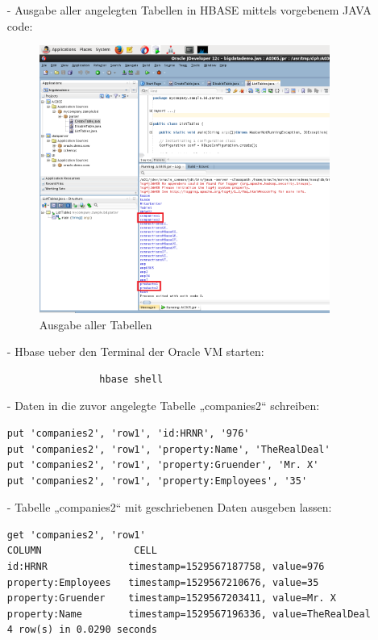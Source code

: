 \begin{itemize}
\item[-] Ausgabe aller angelegten Tabellen in HBASE mittels vorgebenem JAVA code:
\begin{figure}[!htb]
        \begin{minipage}{1\textwidth}
                \centering
                \includegraphics[width=0.90\textwidth]{pics/hbase3.png}\par\vspace{0cm}
                \caption{Ausgabe aller Tabellen}
                \label{fig:hbase3}
        \end{minipage}
\end{figure}

\item[-] Hbase ueber den Terminal der Oracle VM starten:
\begin{lstlisting}
                hbase shell
\end{lstlisting}

\item[-] Daten in die zuvor angelegte Tabelle „companies2“ schreiben:
\begin{lstlisting}
put 'companies2', 'row1', 'id:HRNR', '976'
put 'companies2', 'row1', 'property:Name', 'TheRealDeal'
put 'companies2', 'row1', 'property:Gruender', 'Mr. X'
put 'companies2', 'row1', 'property:Employees', '35'
\end{lstlisting}

\item[-] Tabelle „companies2“ mit geschriebenen Daten ausgeben lassen:
\begin{lstlisting}
get 'companies2', 'row1'
COLUMN                CELL
id:HRNR              timestamp=1529567187758, value=976
property:Employees   timestamp=1529567210676, value=35
property:Gruender    timestamp=1529567203411, value=Mr. X
property:Name        timestamp=1529567196336, value=TheRealDeal
4 row(s) in 0.0290 seconds
\end{lstlisting}


\end{itemize}
